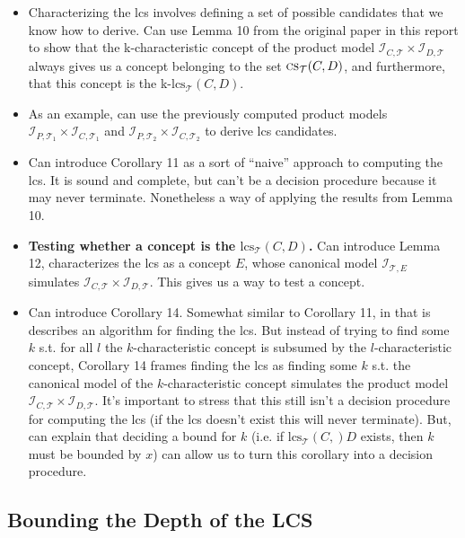 \documentclass[a4paper,USenglish,cleveref,autoref,thm-restate]{lipics-v2021}
\newcommand{\interpretation}{\mathcal{I}}
\newcommand{\TBox}{\mathcal{T}}
\newcommand{\lcs}[2]{\text{lcs}_{\TBox}(#1, #2)}
\newcommand{\canonical}[2]{\interpretation_{#1, #2}}
\begin{document}
    \begin{itemize}
        \item Characterizing the lcs involves defining a set of possible candidates that we know how to derive. Can use Lemma 10
        from the original paper in this report to show that the k-characteristic concept of the product model 
        $\canonical{C}{\TBox} \times \canonical{D}{\TBox}$ always gives us a concept belonging to the set $\textsc{cs}_{\TBox}(C, D)$, and furthermore,
        that this concept is the k-$\lcs{C}{D}$. 
        \item As an example, can use the previously computed product models $\canonical{P}{\TBox_1} \times \canonical{C}{\TBox_1}$ 
        and $\canonical{P}{\TBox_2} \times \canonical{C}{\TBox_2}$ to derive lcs candidates. 
        \item Can introduce Corollary 11 as a sort of ``naive'' approach to computing the lcs. It is 
        sound and complete, but can't be a decision procedure because it may never terminate. Nonetheless 
        a way of applying the results from Lemma 10. 
        \item \textbf{Testing whether a concept is the $\lcs{C}{D}$.} Can introduce Lemma 12, characterizes the lcs 
        as a concept $E$, whose canonical model $\canonical{\TBox}{E}$ simulates $\canonical{C}{\TBox} \times \canonical{D}{\TBox}$.
        This gives us a way to test a concept. 
        \item Can introduce Corollary 14. Somewhat similar to Corollary 11, in that is describes an algorithm for finding the lcs. 
        But instead of trying to find some $k$ s.t. for all $l$ the $k$-characteristic concept is subsumed by the $l$-characteristic 
        concept, Corollary 14 frames finding the lcs as finding some $k$ s.t. the canonical model of the $k$-characteristic concept
        simulates the product model $\canonical{C}{\TBox} \times \canonical{D}{\TBox}$. It's important to stress that this still isn't 
        a decision procedure for computing the lcs (if the lcs doesn't exist this will never terminate). But, can explain that deciding
        a bound for $k$ (i.e. if $\lcs{C}{}D$ exists, then $k$ must be bounded by $x$) can allow us to turn this corollary into a decision
        procedure. 
    \end{itemize}

\subsection{Bounding the Depth of the LCS}
\end{document}
